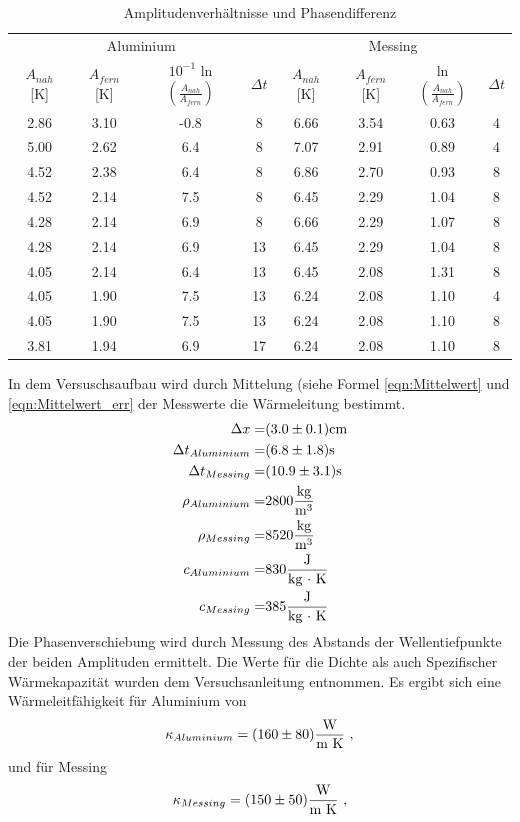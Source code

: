 \begin{table}
	\centering
	\caption{Amplitudenverhältnisse und Phasendifferenz}
	\label{tab:AuP}
	\begin{tabular}{c c c c c c c c}
		\toprule
		\multicolumn{4}{c}{Aluminium} & \multicolumn{4}{c}{Messing}\\
		$A_{nah}$ [K] & $A_{fern}$ [K] & $10^{-1}$ ln $ \left(\frac{A_{nah}}{A_{fern}} \right)$ & $\Delta t$ & $A_{nah}$ [K] & $A_{fern}$ [K] & ln $ \left( \frac{A_{nah}}{A_{fern}} \right) $& $\Delta t$ \\
		\midrule
		2.86 & 3.10 & -0.8 & 8  & 6.66 & 3.54 & 0.63 & 4 \\
		5.00 & 2.62 &  6.4 & 8  & 7.07 & 2.91 & 0.89 & 4 \\
		4.52 & 2.38 &  6.4 & 8  & 6.86 & 2.70 & 0.93 & 8 \\ 
		4.52 & 2.14 &  7.5 & 8  & 6.45 & 2.29 & 1.04 & 8 \\
		4.28 & 2.14 &  6.9 & 8  & 6.66 & 2.29 & 1.07 & 8 \\
		4.28 & 2.14 &  6.9 & 13 & 6.45 & 2.29 & 1.04 & 8 \\
		4.05 & 2.14 &  6.4 & 13 & 6.45 & 2.08 & 1.31 & 8 \\
		4.05 & 1.90 &  7.5 & 13 & 6.24 & 2.08 & 1.10 & 4 \\
		4.05 & 1.90 &  7.5 & 13 & 6.24 & 2.08 & 1.10 & 8 \\ 
		3.81 & 1.94 &  6.9 & 17 & 6.24 & 2.08 & 1.10 & 8 \\
		\bottomrule
	\end{tabular}
\end{table}		
In dem Versuschsaufbau wird durch Mittelung (siehe Formel \ref{eqn:Mittelwert} und \ref{eqn:Mittelwert_err}  der Messwerte die Wärmeleitung \kappa bestimmt.
\begin{eqnarray*}
	\Delta x 			=& ( \num{3.0 +- 0.1} ) \text{cm}	\\
	\Delta t_{Aluminium} 		=& ( \num{6.8 +- 1.8} ) \text{s}	\\
	\Delta t_{Messing}		=& ( \num{10.9 +- 3.1} ) \text{s}	\\
	\rho_{Aluminium}		=& 2800 \frac{\text{kg}}{\text{m}^3}			\\
	\rho_{Messing}			=& 8520 \frac{\text{kg}}{\text{m}^3}			\\
	c_{Aluminium}			=& 830 \frac{\text{J}}{\text{kg $\cdot$ K}}		\\
	c_{Messing}			=& 385 \frac{\text{J}}{\text{kg $\cdot$ K}}		\\
\end{eqnarray*}
Die Phasenverschiebung wird durch Messung des Abstands der Wellentiefpunkte der beiden Amplituden ermittelt. Die Werte für die Dichte als auch Spezifischer Wärmekapazität wurden dem Versuchsanleitung entnommen. 
Es ergibt sich eine Wärmeleitfähigkeit für Aluminium von 
\begin{equation}
	\kappa_{Aluminium} = (\num{160 +- 80}) \frac{\text{W}}{\text{m K}} \ ,
\end{equation}
und für Messing 
\begin{equation}
        \kappa_{Messing} = (\num{150 +- 50}) \frac{\text{W}}{\text{m K}} \ ,
\end{equation}


